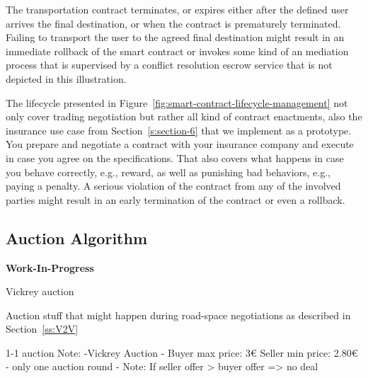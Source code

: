 \documentclass{llncs}
\begin{document}
{			The transportation contract terminates, or expires either after the defined user arrives the final destination, or when the contract is prematurely terminated. Failing to transport the user to the agreed final destination might result in an immediate rollback of the smart contract or invokes some kind of an mediation process that is supervised by a conflict resolution escrow service that is not depicted in this illustration.
	
			The lifecycle presented in Figure~\ref{fig:smart-contract-lifecycle-management} not only cover trading negotiation but rather all kind of contract enactments, also the insurance use case from Section~\ref{s:section-6} that we implement as a prototype. You prepare and negotiate a contract with your insurance company and execute in case you agree on the specifications. That also covers what happens in case you behave correctly, e.g., reward, as well as punishing bad behaviors, e.g., paying a penalty. A serious violation of the contract from any of the involved parties might result in an early termination of the contract or even a rollback.



		
		\subsection{Auction Algorithm}
			\label{ss:auchtion-algorithm}				

			\textbf{Work-In-Progress}
			
			Vickrey auction \cite{ausubel2006lovely}\cite{lucking2000vickrey}
			
			Auction stuff that might happen during road-space negotiations as described in Section~\ref{ss:V2V}

			1-1 auction
			Note:
			-Vickrey Auction
			- Buyer max price: 3€
			Seller min price: 2.80€
			- only one auction round
			- Note: If seller offer > buyer offer => no deal
			
}
\end{document}
